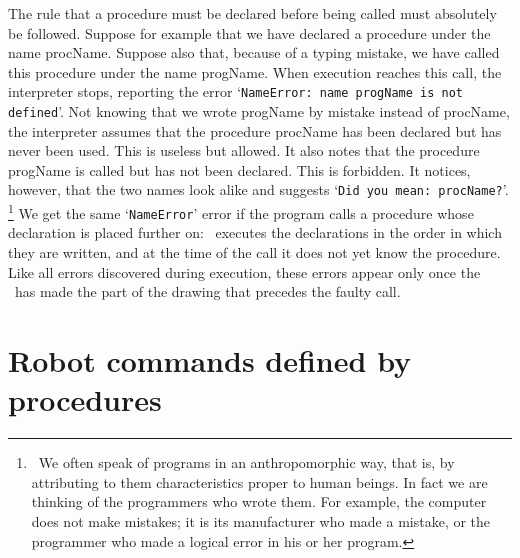 The rule that a procedure must
be
de\-clared before being called must absolutely be followed. Suppose for example that we have
declared a pro\-ce\-dure under the name {\idt procName}. Suppose also
that, because of a typing mistake, we have called this procedure
under the name {\idt progName}. When execution reaches this call, the interpreter
stops, reporting the error
`{\tt NameError: name \textquotesingle{}progName\textquotesingle{} is not defined}'.
Not knowing that
we wrote {\idt progName} by mistake instead of {\idt procName}, the interpreter
assumes that the procedure {\idt procName} has been declared but has never been used.
This is useless but allowed. It also notes that the procedure
{\idt progName} is called but has not been declared. This is forbidden.
It notices, however, that the two names look alike and suggests
`{\tt Did you mean: \textquotesingle{}procName\textquotesingle{}?}'.%
\footnote{\ We often speak of programs in an
anthropomorphic way, that is, by attributing to them characteristics
proper to human beings. In fact we are thinking of the programmers who
wrote them. For example, the computer does not make mistakes; it is its
manufacturer who made a mistake, or the programmer who made a logical
error in his or her program.}
We get the same `{\tt NameError}' error if the program calls a procedure
whose declaration is placed further on: \python\ executes the declarations in
the order in which they are written, and at the time of the call it does not yet know the procedure.
Like all errors discovered during execution, these errors appear
only once the \robot\ has made the part of the drawing that precedes the faulty call.

\section{Robot commands defined by procedures}

